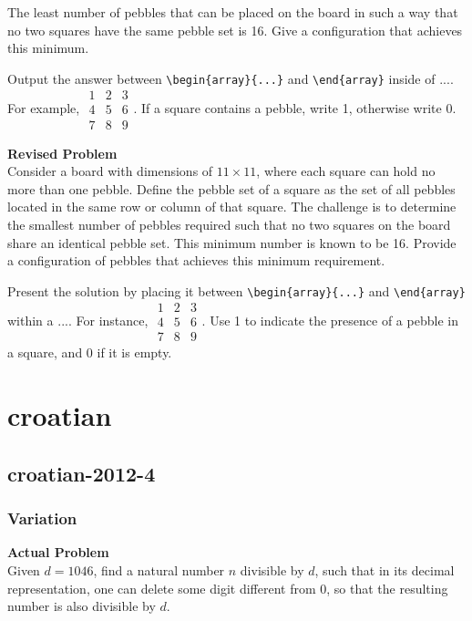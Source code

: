 The least number of pebbles that can be placed on the board in such a way that no two squares have the same pebble set is 16. Give a configuration that achieves this minimum.

Output the answer between \verb|\begin{array}{...}| and \verb|\end{array}| inside of $\boxed{...}$. For example, $\boxed{\begin{array}{ccc}1 & 2 & 3 \\ 4 & 5 & 6 \\ 7 & 8 & 9\end{array}}$.
If a square contains a pebble, write 1, otherwise write 0.

\textbf{Revised Problem}\\
Consider a board with dimensions of $11 \times 11$, where each square can hold no more than one pebble. Define the pebble set of a square as the set of all pebbles located in the same row or column of that square. The challenge is to determine the smallest number of pebbles required such that no two squares on the board share an identical pebble set. This minimum number is known to be 16. Provide a configuration of pebbles that achieves this minimum requirement.

Present the solution by placing it between \verb|\begin{array}{...}| and \verb|\end{array}| within a $\boxed{...}$. For instance, $\boxed{\begin{array}{ccc}1 & 2 & 3 \\ 4 & 5 & 6 \\ 7 & 8 & 9\end{array}}$. Use 1 to indicate the presence of a pebble in a square, and 0 if it is empty.

\section{croatian}
\subsection{croatian-2012-4}
\subsubsection{Variation}
\textbf{Actual Problem}\\
Given $d = 1046$, find a natural number $n$ divisible by $d$, such that in its decimal representation, one can delete some digit different from $0$, so that the resulting number is also divisible by $d$.


